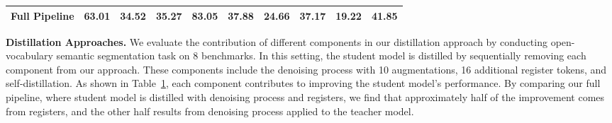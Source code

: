\documentclass{article}
\begin{document}
\begin{table}[t]
{\begin{tabular}{l|ccccccccc}
Full Pipeline   & \textbf{63.01} & \textbf{34.52} & \textbf{35.27} & \textbf{83.05} & \textbf{37.88} & \textbf{24.66} & \textbf{37.17} & \textbf{19.22} & \textbf{41.85} \\ \hline
\end{tabular}}
\vspace{-.2cm}
\label{tab:ditisll}
\end{table} \textbf{Distillation Approaches.} We evaluate the contribution of different components in our distillation approach by conducting open-vocabulary semantic segmentation task on 8 benchmarks. In this setting, the student model is distilled by sequentially removing each component from our approach. These components include the denoising process with 10 augmentations, 16 additional register tokens, and self-distillation.
As shown in Table~\ref{tab:ditisll}, each component contributes to improving the student model's performance. By comparing our full pipeline, where student model is distilled with denoising process and registers, we find that approximately half of the improvement comes from registers, and the other half results from denoising process applied to the teacher model.
\end{document}
